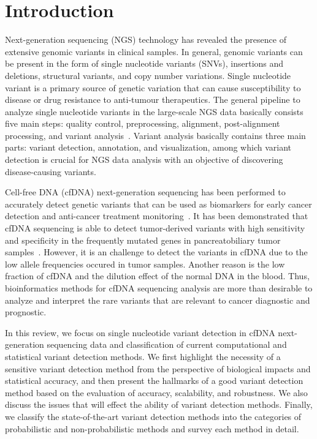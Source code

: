 \documentclass[a4,center,fleqn]{NAR}
\begin{document}
\section{Introduction}
Next-generation sequencing (NGS) technology has revealed the presence of extensive genomic variants in clinical samples.
In general, genomic variants can be present in the form of single nucleotide variants (SNVs), insertions and deletions, structural variants, and copy number variations.
Single nucleotide variant is a primary source of genetic variation that can cause susceptibility to disease or drug resistance to  anti-tumour therapeutics.
The general pipeline to analyze single nucleotide variants in the large-scale NGS data basically consists five main steps: quality control, preprocessing, alignment, post-alignment processing, and variant analysis~\citep{Bao2014}.
Variant analysis basically contains three main parts: variant detection, annotation, and visualization, among which variant detection is crucial for NGS data analysis with an objective of discovering disease-causing variants.


Cell-free DNA (cfDNA) next-generation sequencing has been performed to accurately detect genetic variants that can be used as biomarkers for early cancer detection and anti-cancer treatment monitoring~\citep{schwarzenbach2011cell, zhou2014pilot}.
It has been demonstrated that cfDNA sequencing is able to detect tumor-derived variants with high sensitivity and specificity in the frequently mutated genes in pancreatobiliary tumor samples~\citep{zill2015cell}.
However, it is an challenge to detect the variants in cfDNA due to the low allele frequencies occured in tumor samples.
Another reason is the low fraction of cfDNA and the dilution effect of the normal DNA in the blood. 
Thus, bioinformatics methods for cfDNA sequencing analysis are more than desirable to analyze and interpret the rare variants that are relevant to cancer diagnostic and prognostic.


In this review, we focus on single nucleotide variant detection in cfDNA next-generation sequencing data and classification of current computational and statistical variant detection methods.
We first highlight the necessity of a sensitive variant detection method from the perspective of biological impacts and statistical accuracy,
and then present the hallmarks of a good variant detection method based on the evaluation of accuracy, scalability, and robustness.
We also discuss the issues that will effect the ability of variant detection methods.
Finally, we classify the state-of-the-art variant detection methods into the categories of probabilistic and non-probabilistic methods and survey each method in detail.
\end{document}
